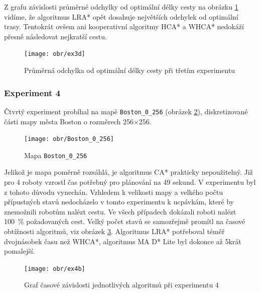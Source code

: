 Z grafu závislosti průměrné odchylky od optimální délky cesty na obrázku \ref{obr:ex3d} vidíme, že algoritmus LRA* opět dosahuje největších odchylek od optimální trasy. Tentokrát ovšem ani kooperativní algoritmy HCA* a WHCA* nedokáží přesně následovat nejkratší cestu.

\vspace*{-10mm}
\begin{figure}[H]
	\begin{center}
		\texttt{[image: obr/ex3d]}
	\end{center}
	\vspace*{-10mm}
	\caption[caption]{Průměrná odchylka od optimální délky cesty při třetím experimentu}
	\label{obr:ex3d}
\end{figure}

\subsubsection{Experiment 4}
Čtvrtý experiment probíhal na mapě \texttt{Boston\_0\_256} (obrázek \ref{obr:Boston_0_256}), diskretizované části mapy města Boston o rozměrech 256×256.

\begin{figure}[htb]
	\begin{center}
		\texttt{[image: obr/Boston\_0\_256]}
	\end{center}
	\caption[caption]{Mapa \texttt{Boston\_0\_256}  \cite{Sturtevant2012}}
	\label{obr:Boston_0_256}
\end{figure}

Jelikož je mapa poměrně rozsáhlá, je algoritmus CA* prakticky nepoužitelný. Již pro 4 roboty vzrostl čas potřebný pro plánování na 49 sekund. V experimentu byl z tohoto důvodu vynechán. Vzhledem k velikosti mapy a velkého počtu přípustných stavů nedocházelo v tomto experimentu k ucpávkám, které by znemožnili robotům nalézt cestu. Ve všech případech dokázali roboti nalézt 100~\% požadovaných cest. Velký počet stavů se samozřejmě promítl na časové obtížnosti algoritmů, viz obrázek \ref{obr:ex4b}. Algoritmus LRA* potřeboval téměř dvojnásobek času než WHCA*, algoritmus MA D* Lite byl dokonce až 5krát pomalejší.

\vspace*{-10mm}
\begin{figure}[H]
	\begin{center}
		\texttt{[image: obr/ex4b]}
	\end{center}
	\vspace*{-10mm}
	\caption[caption]{Graf časové závislosti jednotlivých algoritmů při experimentu 4}
	\label{obr:ex4b}
\end{figure}

